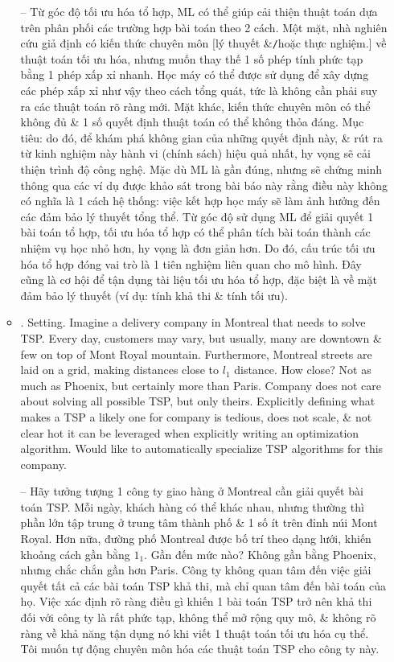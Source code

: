 \documentclass{article}
\begin{document}
\begin{itemize}
\begin{itemize}
        -- Từ góc độ tối ưu hóa tổ hợp, ML có thể giúp cải thiện thuật toán dựa trên phân phối các trường hợp bài toán theo 2 cách. Một mặt, nhà nghiên cứu giả định có kiến thức chuyên môn [lý thuyết \&{\tt/}hoặc thực nghiệm.] về thuật toán tối ưu hóa, nhưng muốn thay thế 1 số phép tính phức tạp bằng 1 phép xấp xỉ nhanh. Học máy có thể được sử dụng để xây dựng các phép xấp xỉ như vậy theo cách tổng quát, tức là không cần phải suy ra các thuật toán rõ ràng mới. Mặt khác, kiến thức chuyên môn có thể không đủ \& 1 số quyết định thuật toán có thể không thỏa đáng. Mục tiêu: do đó, để khám phá không gian của những quyết định này, \& rút ra từ kinh nghiệm này hành vi (chính sách) hiệu quả nhất, hy vọng sẽ cải thiện trình độ công nghệ. Mặc dù ML là gần đúng, nhưng sẽ chứng minh thông qua các ví dụ được khảo sát trong bài báo này rằng điều này không có nghĩa là 1 cách hệ thống: việc kết hợp học máy sẽ làm ảnh hưởng đến các đảm bảo lý thuyết tổng thể. Từ góc độ sử dụng ML để giải quyết 1 bài toán tổ hợp, tối ưu hóa tổ hợp có thể phân tích bài toán thành các nhiệm vụ học nhỏ hơn, hy vọng là đơn giản hơn. Do đó, cấu trúc tối ưu hóa tổ hợp đóng vai trò là 1 tiên nghiệm liên quan cho mô hình. Đây cũng là cơ hội để tận dụng tài liệu tối ưu hóa tổ hợp, đặc biệt là về mặt đảm bảo lý thuyết (ví dụ: tính khả thi \& tính tối ưu).
        \item {. Setting.} Imagine a delivery company in Montreal that needs to solve TSP. Every day, customers may vary, but usually, many are downtown \& few on top of Mont Royal mountain. Furthermore, Montreal streets are laid on a grid, making distances close to $l_1$ distance. How close? Not as much as Phoenix, but certainly more than Paris. Company does not care about solving all possible TSP, but only theirs. Explicitly defining what makes a TSP a likely one for company is tedious, does not scale, \& not clear hot it can be leveraged when explicitly writing an optimization algorithm. Would like to automatically specialize TSP algorithms for this company.

        -- Hãy tưởng tượng 1 công ty giao hàng ở Montreal cần giải quyết bài toán TSP. Mỗi ngày, khách hàng có thể khác nhau, nhưng thường thì phần lớn tập trung ở trung tâm thành phố \& 1 số ít trên đỉnh núi Mont Royal. Hơn nữa, đường phố Montreal được bố trí theo dạng lưới, khiến khoảng cách gần bằng $1_1$. Gần đến mức nào? Không gần bằng Phoenix, nhưng chắc chắn gần hơn Paris. Công ty không quan tâm đến việc giải quyết tất cả các bài toán TSP khả thi, mà chỉ quan tâm đến bài toán của họ. Việc xác định rõ ràng điều gì khiến 1 bài toán TSP trở nên khả thi đối với công ty là rất phức tạp, không thể mở rộng quy mô, \& không rõ ràng về khả năng tận dụng nó khi viết 1 thuật toán tối ưu hóa cụ thể. Tôi muốn tự động chuyên môn hóa các thuật toán TSP cho công ty này.


\end{itemize}
\end{itemize}
\end{document}
